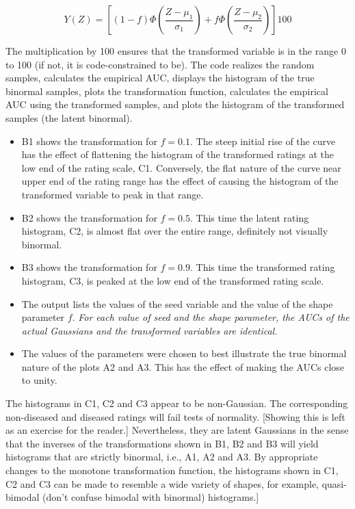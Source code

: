 \documentclass[
]{book}
\providecommand{\tightlist}{%
  \setlength{\itemsep}{0pt}\setlength{\parskip}{0pt}}
\begin{document}
\begin{equation} 
Y\left ( Z \right )=\left [ \left ( 1-f \right )\Phi\left ( \frac{Z-\mu_1}{\sigma_1} \right )+f\Phi\left ( \frac{Z-\mu_2}{\sigma_2} \right ) \right ]100
\label{eq:binormal-modelDemoMisconception}
\end{equation}

The multiplication by 100 ensures that the transformed variable is in the range 0 to 100 (if not, it is code-constrained to be). The code realizes the random samples, calculates the empirical AUC, displays the histogram of the true binormal samples, plots the transformation function, calculates the empirical AUC using the transformed samples, and plots the histogram of the transformed samples (the latent binormal).

\begin{itemize}
\tightlist
\item
  B1 shows the transformation for \(f = 0.1\). The steep initial rise of the curve has the effect of flattening the histogram of the transformed ratings at the low end of the rating scale, C1. Conversely, the flat nature of the curve near upper end of the rating range has the effect of causing the histogram of the transformed variable to peak in that range.
\item
  B2 shows the transformation for \(f = 0.5\). This time the latent rating histogram, C2, is almost flat over the entire range, definitely not visually binormal.
\item
  B3 shows the transformation for \(f = 0.9\). This time the transformed rating histogram, C3, is peaked at the low end of the transformed rating scale.
\item
  The output lists the values of the seed variable and the value of the shape parameter \(f\). \emph{For each value of seed and the shape parameter, the AUCs of the actual Gaussians and the transformed variables are identical}.
\item
  The values of the parameters were chosen to best illustrate the true binormal nature of the plots A2 and A3. This has the effect of making the AUCs close to unity.
\end{itemize}

The histograms in C1, C2 and C3 appear to be non-Gaussian. The corresponding non-diseased and diseased ratings will fail tests of normality. {[}Showing this is left as an exercise for the reader.{]} Nevertheless, they are latent Gaussians in the sense that the inverses of the transformations shown in B1, B2 and B3 will yield histograms that are strictly binormal, i.e., A1, A2 and A3. By appropriate changes to the monotone transformation function, the histograms shown in C1, C2 and C3 can be made to resemble a wide variety of shapes, for example, quasi-bimodal (don't confuse bimodal with binormal) histograms.{]}
\end{document}
